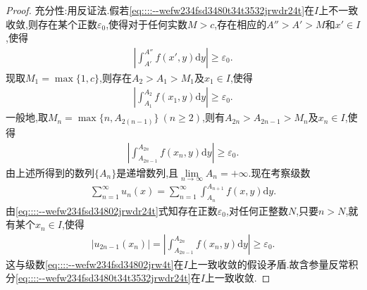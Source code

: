 \documentclass[../../main.tex]{subfiles}%
\begin{document}
\begin{proof}
{\heiti 充分性:}用反证法.假若\eqref{eq::::--wefw234fsd3480t34t3532jrwdr24t}在$I$上不一致收敛,则存在某个正数$\varepsilon_0$,使得对于任何实数$M > c$,存在相应的$A'' > A' > M$和$x' \in I$,使得
\begin{align*}
\left| \int_{A'}^{A''} f(x',y)\mathrm{d}y \right| \geqslant \varepsilon_0.
\end{align*}
现取$M_1 = \max\{1,c\}$,则存在$A_2 > A_1 > M_1$及$x_1 \in I$,使得
\begin{align*}
\left| \int_{A_1}^{A_2} f(x_1,y)\mathrm{d}y \right| \geqslant \varepsilon_0.
\end{align*}
一般地,取$M_n = \max\{n,A_{2(n-1)}\}\ (n \geqslant 2)$,则有$A_{2n} > A_{2n-1} > M_n$及$x_n \in I$,使得
\begin{align}
\left| \int_{A_{2n-1}}^{A_{2n}} f(x_n,y)\mathrm{d}y \right| \geqslant \varepsilon_0. \label{eq::::--wefw234fsd34802jrwdr24t}
\end{align}
由上述所得到的数列$\{A_n\}$是递增数列,且$\lim\limits_{n \to \infty} A_n = +\infty$.现在考察级数
\begin{align*}
\sum_{n=1}^{\infty} u_n(x) = \sum_{n=1}^{\infty} \int_{A_n}^{A_{n+1}} f(x,y)\mathrm{d}y.
\end{align*}
由\eqref{eq::::--wefw234fsd34802jrwdr24t}式知存在正数$\varepsilon_0$,对任何正整数$N$,只要$n > N$,就有某个$x_n \in I$,使得
\begin{align*}
|u_{2n-1}(x_n)| = \left| \int_{A_{2n-1}}^{A_{2n}} f(x_n,y)\mathrm{d}y \right| \geqslant \varepsilon_0.
\end{align*}
这与级数\eqref{eq::::--wefw234fsd34802jrw4t}在$I$上一致收敛的假设矛盾.故含参量反常积分\eqref{eq::::--wefw234fsd3480t34t3532jrwdr24t}在$I$上一致收敛.
\end{proof}
\end{document}
